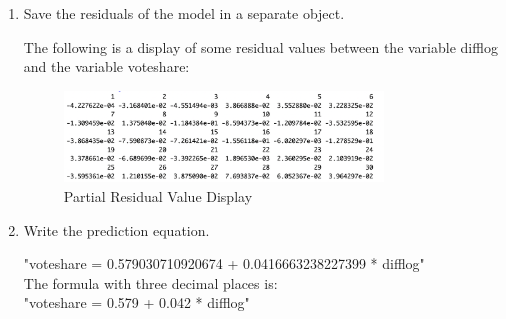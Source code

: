 \documentclass[12pt,letterpaper]{article}
\begin{document}
\begin{enumerate}
		\item Save the residuals of the model in a separate object.	\vspace{1cm}
		
		The following is a display of some residual values between the variable difflog and the variable voteshare:\\
		\begin{figure}[h!]
			\caption{\footnotesize{Partial Residual Value Display}}
			\vspace{.5cm}
			\centering
			\label{fig:1.3}
			\includegraphics[width=0.8\textwidth]{residuals1.png}
		\end{figure}
		
		\item Write the prediction equation.
		
		"voteshare = 0.579030710920674 + 0.0416663238227399 * difflog"\\
		The formula with three decimal places is:\\
		"voteshare = 0.579 + 0.042 * difflog"\\
	\end{enumerate}
	
\newpage
\end{document}
